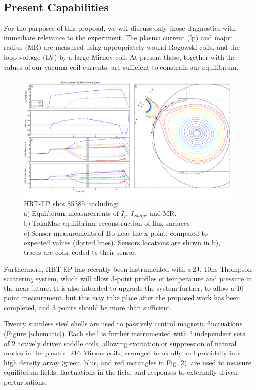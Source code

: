 \documentclass[aps,prl,twocolumn,superscriptaddress,groupedaddress]{revtex4}  %
\begin{document}
\subsection{Present Capabilities}
	For the purposes of this proposal, we will discuss only those diagnostics with immediate relevance to the experiment.  The plasma current (Ip) and major radius (MR) are measured using appropriately wound Rogowski coils, and the loop voltage (LV) by a large Mirnov coil.  At present these, together with the values of our vacuum coil currents, are sufficient to constrain our equilibrium.\par
	\begin{figure}[htb]
	\centering
\includegraphics[scale=.1925]{../Plots/shot_85388_currents_fields_fluxes_better_aspect_ratio.png}\caption{HBT-EP shot 85385, including: \\a) Equlibrium measurements of $I_p$, $I_{Shape}$ and MR.\\  b) TokaMac equilibrium reconstruction of flux surfaces\\c) Sensor measurements of Bp near the x-point, compared to expected values (dotted lines).  Sensors locations are shown in b), traces are color coded to their sensor.\\}
	\label{fluxes and fields}
	\end{figure}
	Furthermore, HBT-EP has recently been instrumented with a 2J, 10ns Thompson scattering system, which will allow 3-point profiles of temperature and pressure in the near future.  It is also intended to upgrade the system further, to allow a 10-point measurement, but this may take place after the proposed work has been completed, and 3 points should be more than sufficient.\par
	Twenty stainless steel shells are used to passively control magnetic fluctuations (Figure \ref{schematic}).  Each shell is further instrumented with 3 independent sets of 2 actively driven saddle coils, allowing excitation or suppression of natural modes in the plasma.  216 Mirnov coils, arranged toroidally and poloidally in a high density array (green, blue, and red rectangles in Fig. 2), are used to measure equilibrium fields, fluctuations in the field, and responses to externally driven perturbations.\par
\end{document}
